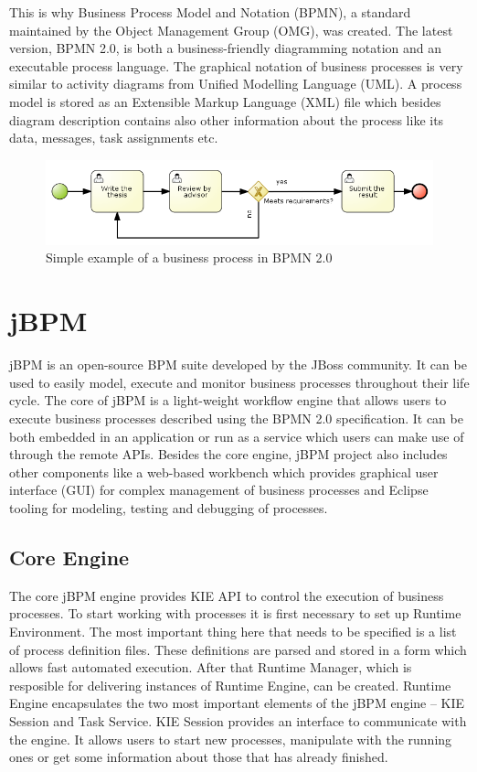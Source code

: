 \documentclass[12pt,oneside,final]{fithesis2}
\begin{document}
This is why Business Process Model and Notation (BPMN), a standard maintained by the Object Management Group (OMG), was created.
The latest version, BPMN 2.0, is both a business-friendly diagramming notation and an executable process language. \cite{silver11}
The graphical notation of business processes is very similar to activity diagrams from Unified Modelling Language (UML).
A process model is stored as an Extensible Markup Language (XML) file which besides diagram description contains also other information about the process like its data, messages, task assignments etc.

\begin{figure}[ht!]
\centering
\includegraphics[width=\textwidth]{images/process-example.png}
\caption{Simple example of a business process in BPMN 2.0}
\label{fig:process-example}
\end{figure}

\section{jBPM}
jBPM is an open-source BPM suite developed by the JBoss community.
It can be used to easily model, execute and monitor business processes throughout their life cycle.
The core of jBPM is a light-weight workflow engine that allows users to execute business processes described using the BPMN 2.0 specification.
It can be both embedded in an application or run as a service which users can make use of through the remote APIs.
Besides the core engine, jBPM project also includes other components like a web-based workbench which provides graphical user interface (GUI) for complex management of business processes and Eclipse\footnotemark{} tooling for modeling, testing and debugging of processes.
\cite{jbpm6overview}

\subsection{Core Engine}
\label{subsec:core-engine}
The core jBPM engine provides KIE\footnotemark{} API \cite{jbpm6api} to control the execution of business processes.
To start working with processes it is first necessary to set up Runtime Environment.
The most important thing here that needs to be specified is a list of process definition files.
These definitions are parsed and stored in a form which allows fast automated execution.
After that Runtime Manager, which is resposible for delivering instances of Runtime Engine, can be created.
Runtime Engine encapsulates the two most important elements of the jBPM engine -- KIE Session and Task Service.
KIE Session provides an interface to communicate with the engine.
It allows users to start new processes, manipulate with the running ones or get some information about those that has already finished.
\cite{jbpm6engine}
\end{document}
